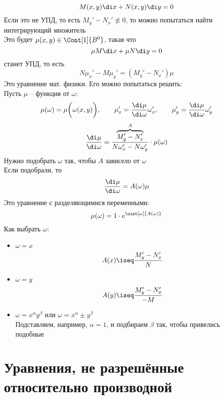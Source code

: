 $$ M(x, y) \di x + N(x, y) \di y = 0 $$
Если это не УПД, то есть $ M_y' - N_x' \not\equiv 0 $, то можно попытаться найти интегрирующий множитель \\
Это будет $ \mu(x ,y) \in \Cont[1]{B^0} $, такая что
$$ \mu M\di x + \mu N \di y = 0 $$
станет УПД, то есть
$$ N\mu_x' - M\mu_y' = (M_y' - N_x')\mu $$
Это уравнение мат. физики. Его можно попытаться решить: \\
Пусть $ \mu $ -- функция от $ \omega $:
$$ \mu(\omega) = \mu \bigg( \omega(x, y) \bigg), \qquad \mu_x' = \frac{\di \mu}{\di \omega}\omega_x', \qquad \mu_y' = \frac{\di \mu}{\di \omega}\omega_y' $$
$$ \frac{\di \mu}{\di \omega} = \frac{\overbrace{M_y' - N_x'}^A}{N\omega_x' - N\omega_y'} \cdot \mu(\omega) $$
Нужно подобрать $ \omega $ так, чтобы $ A $ зависело от $ \omega $ \\
Если подобрали, то
$$ \frac{\di\mu}{\di\omega} = A(\omega)\mu $$
Это уравнение с разделяющимися переменными:
$$ \mu(\omega) = 1 \cdot e^{\uint[\omega]{A(\omega)}} $$
Как выбрать $ \omega $:
\begin{itemize}
	\item $ \omega = x $
    $$ A(x) \iseq \frac{M_y' - N_x'}N $$
    \item $ \omega = y $
    $$ A(y) \iseq \frac{M_y' - N_x'}{-M} $$
    \item $ \omega = x^\alpha y^\beta $ или $ \omega = x^\alpha \pm y^\beta $ \\
    Подставляем, например, $ \alpha = 1 $, и подбираем $ \beta $ так, чтобы привелись подобные
\end{itemize}

\part{Уравнения, не разрешённые относительно \n производной}

